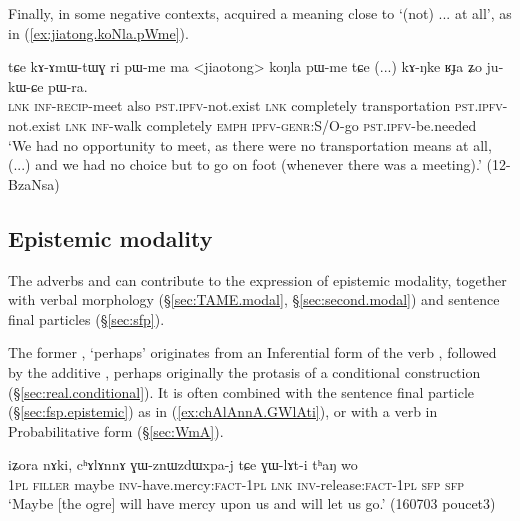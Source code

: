 Finally, in some negative contexts,  acquired a meaning close to  `(not) ... at all', as in (\ref{ex:jiatong.koNla.pWme}).
\largerpage 
\begin{exe}
\ex \label{ex:jiatong.koNla.pWme}
\gll  tɕe kɤ-ɤmɯ-tɯɣ ri pɯ-me ma <jiaotong> koŋla pɯ-me tɕe (...) kɤ-ŋke ʁɟa ʑo ju-kɯ-ɕe pɯ-ra.  \\
\textsc{lnk} \textsc{inf}-\textsc{recip}-meet also \textsc{pst}.\textsc{ipfv}-not.exist \textsc{lnk} completely transportation \textsc{pst}.\textsc{ipfv}-not.exist \textsc{lnk} { } \textsc{inf}-walk completely \textsc{emph} \textsc{ipfv}-\textsc{genr}:S/O-go \textsc{pst}.\textsc{ipfv}-be.needed \\
\glt `We had no opportunity to meet, as there were no transportation means at all, (...) and we had no choice but to go on foot (whenever there was a meeting).' (12-BzaNsa)
\end{exe} 


 \subsection{Epistemic modality}\label{sec:modality.adverbs}
 The adverbs  and   can contribute to the expression of epistemic modality, together with verbal morphology (§\ref{sec:TAME.modal}, §\ref{sec:second.modal}) and sentence final particles (§\ref{sec:sfp}).
 
 The former , `perhaps' originates from an Inferential form of the verb , followed by the additive , perhaps originally the protasis of a conditional construction (§\ref{sec:real.conditional}). It is often combined with the sentence final particle  (§\ref{sec:fsp.epistemic}) as in (\ref{ex:chAlAnnA.GWlAti}), or with a  verb in Probabilitative form (§\ref{sec:WmA}).
 
 \begin{exe}
\ex \label{ex:chAlAnnA.GWlAti}
\gll iʑora nɤki, cʰɤlɤnnɤ ɣɯ-znɯzdɯxpa-j tɕe ɣɯ-lɤt-i tʰaŋ wo \\
\textsc{1pl} \textsc{filler} maybe \textsc{inv}-have.mercy:\textsc{fact}-\textsc{1pl} \textsc{lnk} \textsc{inv}-release:\textsc{fact}-\textsc{1pl} \textsc{sfp} \textsc{sfp} \\
\glt `Maybe [the ogre] will have mercy upon us and will let us go.' (160703 poucet3)
 \end{exe} 
 

